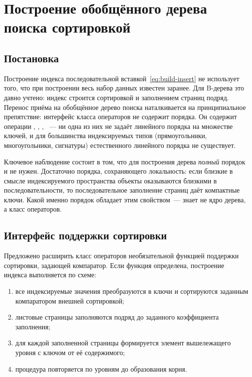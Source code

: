 \chapter{Построение обобщённого дерева поиска сортировкой}
\label{ch:sorted-build}

\section{Постановка}

Построение индекса последовательной вставкой~\eqref{eq:build-insert} не
использует того, что при построении весь набор данных известен заранее. Для
B-дерева это давно учтено: индекс строится сортировкой и заполнением страниц
подряд. Перенос приёма на обобщённое дерево поиска наталкивается на
принципиальное препятствие: интерфейс класса операторов не содержит порядка.
Он содержит операции , , ,
~--- ни одна из них не задаёт линейного порядка на множестве
ключей, и для большинства индексируемых типов (прямоугольники, многоугольники,
сигнатуры) естественного линейного порядка не существует.

Ключевое наблюдение состоит в том, что для построения дерева \emph{полный}
порядок и не нужен. Достаточно порядка, сохраняющего локальность: если близкие в
смысле индексируемого пространства объекты оказываются близкими в
последовательности, то последовательное заполнение страниц даёт компактные
ключи. Какой именно порядок обладает этим свойством~--- знает не ядро дерева, а
класс операторов.

\section{Интерфейс поддержки сортировки}

Предложено расширить класс операторов необязательной функцией поддержки
сортировки, задающей компаратор. Если функция определена, построение индекса
выполняется по схеме:

\begin{enumerate}
\item все индексируемые значения преобразуются в ключи и сортируются заданным
      компаратором внешней сортировкой;
\item листовые страницы заполняются подряд до заданного коэффициента заполнения;
\item для каждой заполненной страницы формируется элемент вышележащего уровня
      с ключом  от её содержимого;
\item процедура повторяется по уровням до образования корня.
\end{enumerate}

